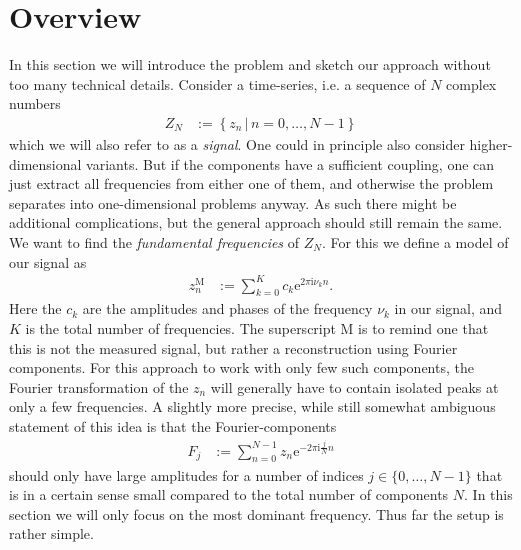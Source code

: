 \documentclass[english, parskip=full]{scrartcl}     %
\title{\titel}
\author{\autor}
\date{\today}
\newcommand{\klammer}{}
\newcommand{\tecxt}{}
\renewcommand{\i}{\text{i}}
\newcommand{\e}{\text{e}}
\begin{document}
\maketitle  %
\tableofcontents  %

\section{Overview}
In this section we will introduce the problem and sketch our approach without too many technical details.
Consider a time-series, i.e. a sequence of $N$ complex numbers
\begin{align}
Z_N &:= \klammer\left\{ z_n \, \vert \, n=0,\dots,N-1 \right\}
\end{align}
which we will also refer to as a \emph{signal}.
One could in principle also consider higher-dimensional variants.
But if the components have a sufficient coupling, one can just extract all frequencies from either one of them, and otherwise the problem separates into one-dimensional problems anyway.
As such there might be additional complications, but the general approach should still remain the same.
\\
We want to find the \emph{fundamental frequencies} of $Z_N$.
For this we define a model of our signal as
\begin{align}
z_n^\tecxt\text{M} &:= \sum_{k=0}^K c_k \e^{2\pi\i \nu_k n}.
\end{align}
Here the $c_k$ are the amplitudes and phases of the frequency $\nu_k$ in our signal, and $K$ is the total number of frequencies.
The superscript M is to remind one that this is not the measured signal, but rather a reconstruction using Fourier components.
For this approach to work with only few such components, the Fourier transformation of the $z_n$ will generally have to contain isolated peaks at only a few frequencies.
A slightly more precise, while still somewhat ambiguous statement of this idea is that the Fourier-components
\begin{align}
F_j &:= \sum_{n=0}^{N-1} z_n \e^{-2\pi\i \frac{j}{N} n}  \label{eqn:definition Fourier components}
\end{align}
should only have large amplitudes for a number of indices $j\in\{0,\dots,N-1\}$ that is in a certain sense small compared to the total number of components $N$.
In this section we will only focus on the most dominant frequency.
Thus far the setup is rather simple.
\end{document}
